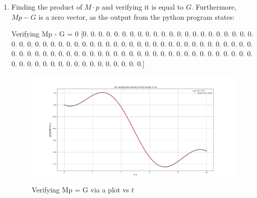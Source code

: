 \documentclass[12pt, a4paper]{report}
\begin{document}
\begin{enumerate}
\item Finding the product of $M\cdot p$ and verifying it is equal to $G$. Furthermore, $Mp-G$ is a zero vector, as the output from the python program states:
\begin{psudo}
Verifying Mp - G = 0
[0. 0. 0. 0. 0. 0. 0. 0. 0. 0. 0. 0. 0. 0. 0. 0. 0. 0. 0. 0. 0. 0. 0. 0.
 0. 0. 0. 0. 0. 0. 0. 0. 0. 0. 0. 0. 0. 0. 0. 0. 0. 0. 0. 0. 0. 0. 0. 0.
 0. 0. 0. 0. 0. 0. 0. 0. 0. 0. 0. 0. 0. 0. 0. 0. 0. 0. 0. 0. 0. 0. 0. 0.
 0. 0. 0. 0. 0. 0. 0. 0. 0. 0. 0. 0. 0. 0. 0. 0. 0. 0. 0. 0. 0. 0. 0. 0.
 0. 0. 0. 0. 0.]
\end{psudo}
\begin{figure}[H]
	\includegraphics[scale=0.35]{Figure_9.png}
	\caption{Verifying Mp = G via a plot vs $t$}
	\label{fig:contour}
\end{figure}


\end{enumerate}
\end{document}
